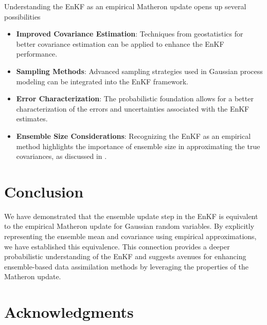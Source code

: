 \documentclass{article}
\theoremstyle{plain}
\begin{document}
Understanding the EnKF as an empirical Matheron update opens up several possibilities

\begin{itemize}
    \item \textbf{Improved Covariance Estimation}: Techniques from geostatistics for better covariance estimation can be applied to enhance the EnKF performance.
    \item \textbf{Sampling Methods}: Advanced sampling strategies used in Gaussian process modeling can be integrated into the EnKF framework.
    \item \textbf{Error Characterization}: The probabilistic foundation allows for a better characterization of the errors and uncertainties associated with the EnKF estimates.
    \item \textbf{Ensemble Size Considerations}: Recognizing the EnKF as an empirical method highlights the importance of ensemble size in approximating the true covariances, as discussed in \citet{Fearnhead2018Particle}.
\end{itemize}

\section{Conclusion}

We have demonstrated that the ensemble update step in the EnKF is equivalent to the empirical Matheron update for Gaussian random variables. By explicitly representing the ensemble mean and covariance using empirical approximations, we have established this equivalence. This connection provides a deeper probabilistic understanding of the EnKF and suggests avenues for enhancing ensemble-based data assimilation methods by leveraging the properties of the Matheron update.

\section*{Acknowledgments}




\end{document}
